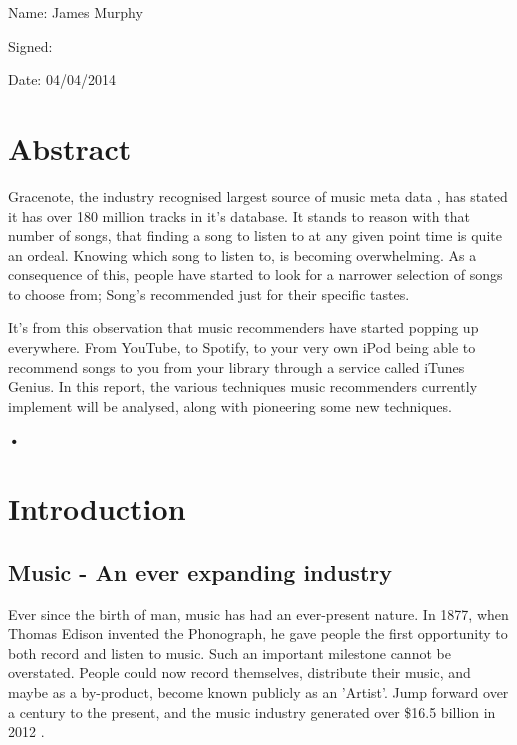 \documentclass[12pt]{article}
\begin{document}
\vspace{2cm}

Name: James Murphy

\vspace{1cm}

Signed:

\vspace{1cm} 
Date: 04/04/2014
\pagebreak
\section*{Abstract}
Gracenote, the industry recognised largest source of music meta data , has stated it has over 180 million tracks \cite{Gracenote2014} in it's database.  It stands to reason with that number of songs, that finding a song to listen to at any given point time is quite an ordeal. Knowing which song to listen to, is becoming overwhelming. As a consequence of this, people have started to look for a narrower selection of songs to choose from; Song's recommended just for their specific tastes. 

It's from this observation that music recommenders have started popping up everywhere. From YouTube, to Spotify, to your very own iPod being able to recommend songs to you from your library through a service called iTunes Genius. In this report, the various techniques music recommenders currently implement will be analysed, along with pioneering some new techniques.

\pagebreak

\tableofcontents
\pagebreak
\textbf{•}
\listoffigures

\pagebreak
\section{Introduction}
\subsection{Music - An ever expanding industry}

Ever since the birth of man, music has had an ever-present nature. In 1877, when Thomas Edison invented the Phonograph, he gave people the first opportunity to both record and listen to music. Such an important milestone cannot be overstated. People could now record themselves, distribute their music, and maybe as a by-product, become known publicly as an 'Artist'. Jump forward over a century to the present, and the music industry generated over \$16.5 billion in 2012 \cite{ifti}.
\end{document}
